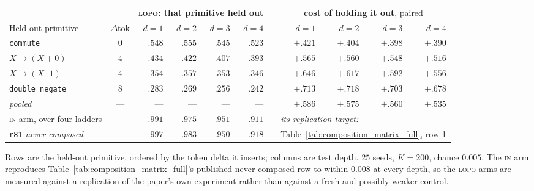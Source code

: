 \begin{center}
\footnotesize
\setlength{\tabcolsep}{3.5pt}
\begin{tabular}{@{}l c rrrr c rrrr@{}}
\toprule
& & \multicolumn{4}{c}{\textbf{\textsc{lopo}: that primitive held out}} & & \multicolumn{4}{c}{\textbf{cost of holding it out}, paired} \\
\cmidrule(r){3-6}\cmidrule(l){8-11}
Held-out primitive & $\Delta$tok & $d{=}1$ & $d{=}2$ & $d{=}3$ & $d{=}4$ & & $d{=}1$ & $d{=}2$ & $d{=}3$ & $d{=}4$ \\
\midrule
\texttt{commute} & $0$ & $.548$ & $.555$ & $.545$ & $.523$ & & $+.421$ & $+.404$ & $+.398$ & $\mathbf{+.390}$ \\
$X \to (X + 0)$ & $4$ & $.434$ & $.422$ & $.407$ & $.393$ & & $+.565$ & $+.560$ & $+.548$ & $\mathbf{+.516}$ \\
$X \to (X \cdot 1)$ & $4$ & $.354$ & $.357$ & $.353$ & $.346$ & & $+.646$ & $+.617$ & $+.592$ & $\mathbf{+.556}$ \\
\texttt{double\_negate} & $8$ & $.283$ & $.269$ & $.256$ & $.242$ & & $+.713$ & $+.718$ & $+.703$ & $\mathbf{+.678}$ \\
\midrule
\emph{pooled} & --- & --- & --- & --- & --- & & $+.586$ & $+.575$ & $+.560$ & $+.535$ \\
\midrule
\textsc{in} arm, over four ladders & --- & $.991$ & $.975$ & $.951$ & $.911$ & & \multicolumn{4}{l}{\emph{its replication target:}} \\
\texttt{r81} \emph{never composed} & --- & $.997$ & $.983$ & $.950$ & $.918$ & & \multicolumn{4}{l}{Table~\ref{tab:composition_matrix_full}, row 1} \\
\bottomrule
\end{tabular}
\end{center}

\noindent Rows are the held-out primitive, ordered by the token delta it inserts; columns are test depth. $25$ seeds, $K{=}200$, chance $0.005$. The \textsc{in} arm reproduces Table~\ref{tab:composition_matrix_full}'s published never-composed row to within $0.008$ at every depth, so the \textsc{lopo} arms are measured against a replication of the paper's own experiment rather than against a fresh and possibly weaker control.

